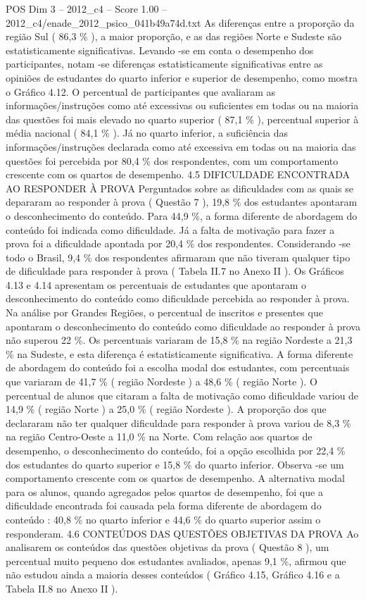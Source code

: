 \begin{textsample}{POS Dim 3 – 2012\_c4 – Score 1.00 – 2012\_c4/enade\_2012\_psico\_041b49a74d.txt}
As diferenças entre a proporção da região Sul ( 86,3 \% ), a maior proporção, e as das regiões Norte e Sudeste são estatisticamente significativas.
Levando -se em conta o desempenho dos participantes, notam -se diferenças estatisticamente significativas entre as opiniões de estudantes do quarto inferior e superior de desempenho, como mostra o Gráfico 4.12.
O percentual de participantes que avaliaram as informações/instruções como até excessivas ou suficientes em todas ou na maioria das questões foi mais elevado no quarto superior ( 87,1 \% ), percentual superior à média nacional ( 84,1 \% ).
Já no quarto inferior, a suficiência das informações/instruções declarada como até excessiva em todas ou na maioria das questões foi percebida por 80,4 \% dos respondentes, com um comportamento crescente com os quartos de desempenho. 4.5 DIFICULDADE ENCONTRADA AO RESPONDER À PROVA Perguntados sobre as dificuldades com as quais se depararam ao responder à prova ( Questão 7 ), 19,8 \% dos estudantes apontaram o desconhecimento do conteúdo.
Para 44,9 \%, a forma diferente de abordagem do conteúdo foi indicada como dificuldade.
Já a falta de motivação para fazer a prova foi a dificuldade apontada por 20,4 \% dos respondentes.
Considerando -se todo o Brasil, 9,4 \% dos respondentes afirmaram que não tiveram qualquer tipo de dificuldade para responder à prova ( Tabela II.7 no Anexo II ).
Os Gráficos 4.13 e 4.14 apresentam os percentuais de estudantes que apontaram o desconhecimento do conteúdo como dificuldade percebida ao responder à prova.
Na análise por Grandes Regiões, o percentual de inscritos e presentes que apontaram o desconhecimento do conteúdo como dificuldade ao responder à prova não superou 22 \%.
Os percentuais variaram de 15,8 \% na região Nordeste a 21,3 \% na Sudeste, e esta diferença é estatisticamente significativa.
A forma diferente de abordagem do conteúdo foi a escolha modal dos estudantes, com percentuais que variaram de 41,7 \% ( região Nordeste ) a 48,6 \% ( região Norte ).
O percentual de alunos que citaram a falta de motivação como dificuldade variou de 14,9 \% ( região Norte ) a 25,0 \% ( região Nordeste ).
A proporção dos que declararam não ter qualquer dificuldade para responder à prova variou de 8,3 \% na região Centro-Oeste a 11,0 \% na Norte.
Com relação aos quartos de desempenho, o desconhecimento do conteúdo, foi a opção escolhida por 22,4 \% dos estudantes do quarto superior e 15,8 \% do quarto inferior.
Observa -se um comportamento crescente com os quartos de desempenho.
A alternativa modal para os alunos, quando agregados pelos quartos de desempenho, foi que a dificuldade encontrada foi causada pela forma diferente de abordagem do conteúdo : 40,8 \% no quarto inferior e 44,6 \% do quarto superior assim o responderam. 4.6 CONTEÚDOS DAS QUESTÕES OBJETIVAS DA PROVA Ao analisarem os conteúdos das questões objetivas da prova ( Questão 8 ), um percentual muito pequeno dos estudantes avaliados, apenas 9,1 \%, afirmou que não estudou ainda a maioria desses conteúdos ( Gráfico 4.15, Gráfico 4.16 e a Tabela II.8 no Anexo II ).

\end{textsample}
